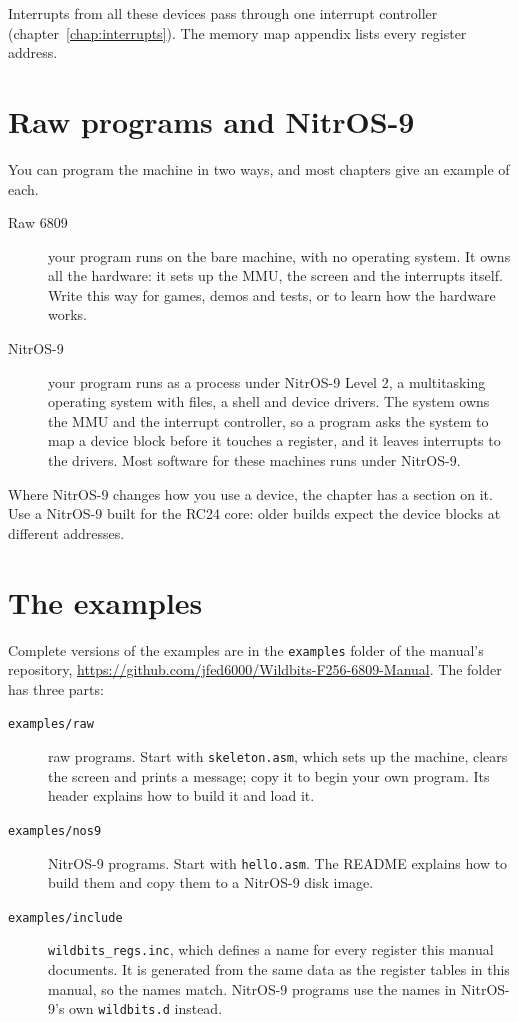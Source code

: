 Interrupts from all these devices pass through one interrupt controller (chapter~\ref{chap:interrupts}). The memory map appendix lists every register address.

\section{Raw programs and NitrOS-9}

You can program the machine in two ways, and most chapters give an example of each.

\begin{description}
    \item[Raw 6809] your program runs on the bare machine, with no operating system. It owns all the hardware: it sets up the MMU, the screen and the interrupts itself. Write this way for games, demos and tests, or to learn how the hardware works.
    \item[NitrOS-9] your program runs as a process under NitrOS-9 Level 2, a multitasking operating system with files, a shell and device drivers. The system owns the MMU and the interrupt controller, so a program asks the system to map a device block before it touches a register, and it leaves interrupts to the drivers. Most software for these machines runs under NitrOS-9.
\end{description}

Where NitrOS-9 changes how you use a device, the chapter has a section on it. Use a NitrOS-9 built for the RC24 core: older builds expect the device blocks at different addresses.

\section{The examples}

Complete versions of the examples are in the \verb+examples+ folder of the manual's repository, \url{https://github.com/jfed6000/Wildbits-F256-6809-Manual}. The folder has three parts:

\begin{description}
    \item[\texttt{examples/raw}] raw programs. Start with \verb+skeleton.asm+, which sets up the machine, clears the screen and prints a message; copy it to begin your own program. Its header explains how to build it and load it.
    \item[\texttt{examples/nos9}] NitrOS-9 programs. Start with \verb+hello.asm+. The README explains how to build them and copy them to a NitrOS-9 disk image.
    \item[\texttt{examples/include}] \verb+wildbits_regs.inc+, which defines a name for every register this manual documents. It is generated from the same data as the register tables in this manual, so the names match. NitrOS-9 programs use the names in NitrOS-9's own \verb+wildbits.d+ instead.
\end{description}

